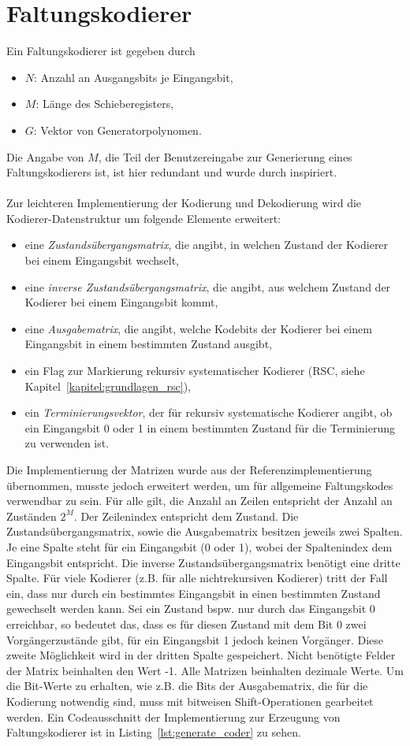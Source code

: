 \section{Faltungskodierer}
\label{kapitel:implementierung_faltungskodierer}
Ein Faltungskodierer ist gegeben durch 
\begin{itemize}
\item $N$: Anzahl an Ausgangsbits je Eingangsbit,
\item $M$: Länge des Schieberegisters,
\item $G$: Vektor von Generatorpolynomen.
\end{itemize}
Die Angabe von $M$, die Teil der Benutzereingabe zur Generierung eines Faltungskodierers ist, ist hier redundant und wurde durch \cite{morelos2006art} inspiriert.
\\
\\
Zur leichteren Implementierung der Kodierung und Dekodierung wird die Kodierer-Datenstruktur um folgende Elemente erweitert:
\begin{itemize}
\item eine \emph{Zustandsübergangsmatrix}, die angibt, in welchen Zustand der Kodierer bei einem Eingangsbit wechselt,
\item eine \emph{inverse Zustandsübergangsmatrix}, die angibt, aus welchem Zustand der Kodierer bei einem Eingangsbit kommt,
\item eine \emph{Ausgabematrix}, die angibt, welche Kodebits der Kodierer bei einem Eingangsbit in einem bestimmten Zustand ausgibt,
\item ein Flag zur Markierung rekursiv systematischer Kodierer (RSC, siehe Kapitel~\ref{kapitel:grundlagen_rsc}),
\item ein \emph{Terminierungsvektor}, der für rekursiv systematische Kodierer angibt, ob ein Eingangsbit 0 oder 1 in einem bestimmten Zustand für die Terminierung zu verwenden ist.
\end{itemize}
Die Implementierung der Matrizen wurde aus der Referenzimplementierung übernommen, musste jedoch erweitert werden, um für allgemeine Faltungskodes verwendbar zu sein. Für alle gilt, die Anzahl an Zeilen entspricht der Anzahl an Zuständen $2^{M}$. Der Zeilenindex entspricht dem Zustand. Die Zustandsübergangsmatrix, sowie die Ausgabematrix besitzen jeweils zwei Spalten. Je eine Spalte steht für ein Eingangsbit (0 oder 1), wobei der Spaltenindex dem Eingangsbit entspricht. Die inverse Zustandsübergangsmatrix benötigt eine dritte Spalte. Für viele Kodierer (z.B. für alle nichtrekursiven Kodierer) tritt der Fall ein, dass nur durch ein bestimmtes Eingangsbit in einen bestimmten Zustand gewechselt werden kann. Sei ein Zustand bspw. nur durch das Eingangsbit 0 erreichbar, so bedeutet das, dass es für diesen Zustand mit dem Bit 0 zwei Vorgängerzustände gibt, für ein Eingangsbit 1 jedoch keinen Vorgänger. Diese zweite Möglichkeit wird in der dritten Spalte gespeichert. Nicht benötigte Felder der Matrix beinhalten den Wert -1. Alle Matrizen beinhalten dezimale Werte. Um die Bit-Werte zu erhalten, wie z.B. die Bits der Ausgabematrix, die für die Kodierung notwendig sind, muss mit bitweisen Shift-Operationen gearbeitet werden. Ein Codeausschnitt der Implementierung zur Erzeugung von Faltungskodierer ist in Listing~\ref{lst:generate_coder} zu sehen.
